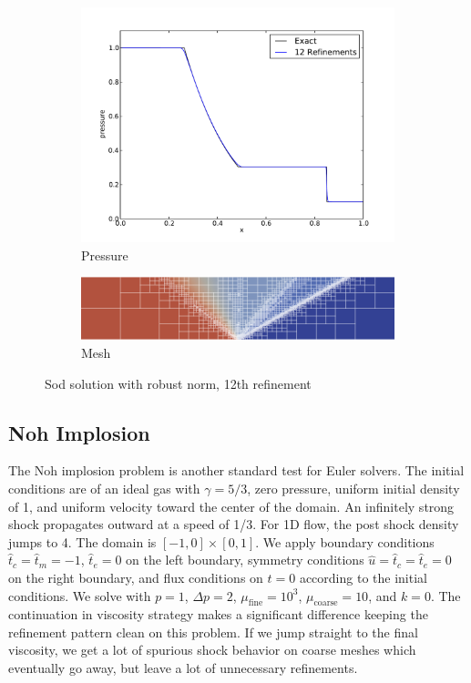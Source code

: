 \documentclass[Dissertation.tex]{subfiles}
\begin{document}
\begin{figure}[!ht]
\begin{subfigure}[t]{0.45\textwidth}
\includegraphics[width=\textwidth]{Dissertation/Sod/Robust-pres13.pdf}
\caption{Pressure}
\end{subfigure}
\begin{subfigure}[t]{0.9\textwidth}
\centering
\includegraphics[width=\textwidth]{Dissertation/Sod/Robust-mesh13.png}
\caption{Mesh}
\end{subfigure}
\caption{Sod solution with robust norm, 12th refinement}
\label{fig:SodRobust12}
\end{figure}

\subsection{Noh Implosion}
The Noh implosion problem\cite{Noh1987} is another standard test for Euler solvers.
The initial conditions are of an ideal gas with $\gamma=5/3$, zero pressure, uniform initial density of 1, 
and uniform velocity toward the center of the domain.
An infinitely strong shock propagates outward at a speed of 1/3.
For 1D flow, the post shock density jumps to 4.
The domain is $[-1,0]\times[0,1]$.
We apply boundary conditions $\hat t_c=\hat t_m=-1$, $\hat t_e=0$ on the left boundary,
symmetry conditions $\hat u=\hat t_c=\hat t_e=0$ on the right boundary, and flux conditions on $t=0$
according to the initial conditions.
We solve with $p=1$, $\Delta p=2$, $\mu_\text{fine}=10^3$, $\mu_\text{coarse}=10$, and $k=0$.
The continuation in viscosity strategy makes a significant difference keeping
the refinement pattern clean on this problem. 
If we jump straight to the final viscosity, we get a lot of spurious shock behavior on coarse meshes
which eventually go away, but leave a lot of unnecessary refinements.
\end{document}

